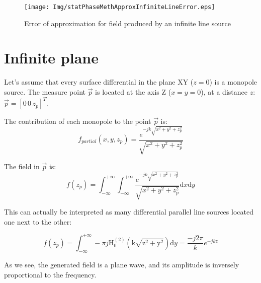 \begin{figure}[h]
\centering
\texttt{[image: Img/statPhaseMethApproxInfiniteLineError.eps]}
\caption{Error of approximation for field produced by an infinite line source}
\end{figure}

\section{Infinite plane}
Let's assume that every surface differential in the plane XY ($z = 0$) is a monopole source. The measure point $\vec{p}$ is located at the axis Z ($x = y = 0$), at a distance $z$: $\vec{p} = [0\, 0\, z_p]^T$.

The contribution of each monopole to the point $\vec{p}$ is:
\begin{equation}
f_{partial}(x, y, z_p) = \frac{e^{-j k \sqrt{x^2 + y^2 + z_p^2}}}{\sqrt{x^2 + y^2 + z_p^2}}
\end{equation}

The field in $\vec{p}$ is:
\begin{equation}
f(z_p) = \int_{-\infty}^{+\infty} \int_{-\infty}^{+\infty} \frac{e^{-j k \sqrt{x^2 + y^2 + z_p^2}}}{\sqrt{x^2 + y^2 + z_p^2}} \mathrm{d}x \mathrm{d}y
\end{equation}

This can actually be interpreted as many differential parallel line sources located one next to the other:

\begin{equation}
f(z_p) = \int_{-\infty}^{+\infty} -\pi j \mathrm{H_0^{(2)}(k \sqrt{z^2 + y^2})} \mathrm{d}y = \frac{-j 2\pi}{k} e^{-j k z}
\end{equation}

As we see, the generated field is a plane wave, and its amplitude is inversely proportional to the frequency.

